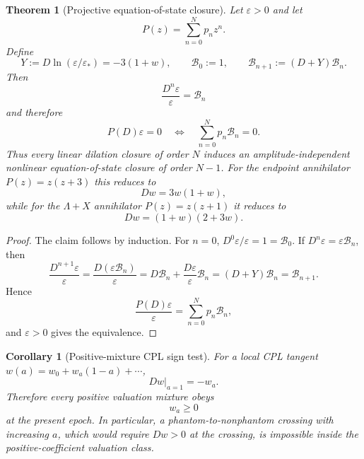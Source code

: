 \documentclass[11pt,a4paper]{article}
\def\Dil{D}%
\numberwithin{equation}{section}
\theoremstyle{definition}
\theoremstyle{plain}
\newtheorem{theorem}[criterion]{Theorem}
\newtheorem{corollary}[criterion]{Corollary}
\theoremstyle{remark}
\newcommand{\Dil}{\mathscr{D}}
\begin{document}
\begin{theorem}[Projective equation-of-state closure]
Let \(\varepsilon>0\) and let
\begin{equation}
P(z)=\sum_{n=0}^{N}p_nz^n.
\end{equation}
Define
\begin{equation}
Y:=\Dil\ln(\varepsilon/\varepsilon_*)=-3(1+w),
\qquad
\mathcal B_0:=1,
\qquad
\mathcal B_{n+1}:=(\Dil+Y)\mathcal B_n.
\end{equation}
Then
\begin{equation}
\frac{\Dil^n\varepsilon}{\varepsilon}=\mathcal B_n
\end{equation}
and therefore
\begin{equation}
\boxed{
P(\Dil)\varepsilon=0
\quad\Longleftrightarrow\quad
\sum_{n=0}^{N}p_n\mathcal B_n=0.
}
\end{equation}
Thus every linear dilation closure of order \(N\) induces an amplitude-independent nonlinear equation-of-state closure of order \(N-1\). For the endpoint annihilator \(P(z)=z(z+3)\) this reduces to
\begin{equation}
\Dil w=3w(1+w),
\end{equation}
while for the \(\Lambda+X\) annihilator \(P(z)=z(z+1)\) it reduces to
\begin{equation}
\Dil w=(1+w)(2+3w).
\end{equation}
\end{theorem}
\begin{proof}
The claim follows by induction. For \(n=0\),
\(\Dil^0\varepsilon/\varepsilon=1=\mathcal B_0\). If
\(\Dil^n\varepsilon=\varepsilon\mathcal B_n\), then
\begin{equation}
\frac{\Dil^{n+1}\varepsilon}{\varepsilon}
=
\frac{\Dil(\varepsilon\mathcal B_n)}{\varepsilon}
=
\Dil\mathcal B_n+
\frac{\Dil\varepsilon}{\varepsilon}\mathcal B_n
=
(\Dil+Y)\mathcal B_n
=
\mathcal B_{n+1}.
\end{equation}
Hence
\begin{equation}
\frac{P(\Dil)\varepsilon}{\varepsilon}
=
\sum_{n=0}^{N}p_n\mathcal B_n,
\end{equation}
and \(\varepsilon>0\) gives the equivalence.
\end{proof}

\begin{corollary}[Positive-mixture CPL sign test]
For a local CPL tangent \(w(a)=w_0+w_a(1-a)+\cdots\),
\begin{equation}
\Dil w\big|_{a=1}=-w_a.
\end{equation}
Therefore every positive valuation mixture obeys
\begin{equation}
\boxed{w_a\ge0}
\end{equation}
at the present epoch. In particular, a phantom-to-nonphantom crossing with increasing \(a\), which would require \(\Dil w>0\) at the crossing, is impossible inside the positive-coefficient valuation class.
\end{corollary}
\end{document}
